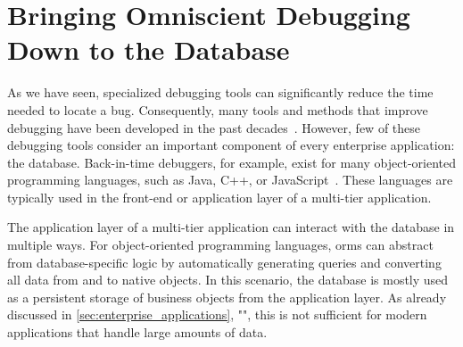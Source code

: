 \chapter{Bringing Omniscient Debugging Down to the Database}

\newcommand{\tool}{TAR\-DISP}
\newcommand{\SQLextension}{Back-in-time SQL}

As we have seen, specialized debugging tools can significantly reduce the time needed to locate a bug.
Consequently, many tools and methods that improve debugging have been developed in the past decades~\cite{wong16:a_survey_on_software}.
However, few of these debugging tools consider an important component of every enterprise application: the database.
Back-in-time debuggers, for example, exist for many object-oriented programming languages, such as Java, C++, or JavaScript~\cite{feldman88:igor_a_system,lewis03:debugging_backwards_in_time,barr16:time-travel_debugging_for_javascriptnode,wong16:a_survey_on_software}.
These languages are typically used in the front-end or application layer of a multi-tier application.



The application layer of a multi-tier application can interact with the database in multiple ways.
For object-oriented programming languages, \acp{orm} can abstract from database-specific logic by automatically generating queries and converting all data from and to native objects.
In this scenario, the database is mostly used as a persistent storage of business objects from the application layer.
As already discussed in \cref{sec:enterprise_applications}, "", 
this is not sufficient for modern applications that handle large amounts of data.

